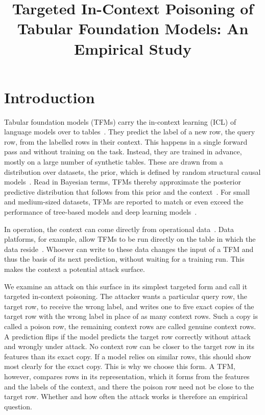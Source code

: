 \documentclass[pdflatex,sn-mathphys-num]{sn-jnl}
\title[Targeted in-context poisoning of tabular foundation models]{Targeted In-Context Poisoning of Tabular Foundation Models: An Empirical Study}
\author*[1]{\fnm{Adem} \sur{Alparslan}}\email{adem.alparslan@fom.de}
\affil*[1]{\orgname{FOM University of Applied Sciences for Economics and Management}, \orgaddress{\city{Essen}, \country{Germany}}}
\begin{document}
\maketitle

\section{Introduction}
\label{sec:einleitung}

Tabular foundation models (TFMs) carry the in-context learning (ICL) of
language models over to tables~\citep{brown2020, muller2022,
hollmann2025, qu2025, vanbreugel2024}. They predict the label of a new
row, the query row, from the labelled rows in their context. This happens
in a single forward pass and without training on the task. Instead, they
are trained in advance, mostly on a large number of synthetic tables.
These are drawn from a distribution over datasets, the prior, which is
defined by random structural causal models~\citep{hollmann2025, qu2026,
grinsztajn2026, jaeger2026}. Read in Bayesian terms, TFMs thereby
approximate the posterior predictive distribution that follows from this
prior and the context~\citep{muller2022, hollmann2025}. For small and
medium-sized datasets, TFMs are reported to match or even exceed the
performance of tree-based models and deep learning
models~\citep{qu2026, grinsztajn2026, kurashkin2026}.

In operation, the context can come directly from operational
data~\citep{sap2026}. Data platforms, for example, allow TFMs to be run
directly on the table in which the data
reside~\citep{kongdas2026, googlecloud2026}. Whoever can write to these
data changes the input of a TFM and thus the basis of its next
prediction, without waiting for a training run. This makes the context a
potential attack surface.

We examine an attack on this surface in its simplest targeted form and
call it targeted in-context poisoning. The attacker wants
a particular query row, the target row, to receive the wrong label, and
writes one to five exact copies of the target row with the wrong label
in place of as many context rows. Such a copy is called a poison row,
the remaining context rows are called genuine context rows. A prediction
flips if the model predicts the target row correctly without attack and
wrongly under attack. No context row can be closer to the target row in
its features than its exact copy. If a model relies on similar rows,
this should show most clearly for the exact copy. This is why we choose
this form. A TFM, however, compares rows in its representation, which it
forms from the features and the labels of the context, and there the
poison row need not be close to the target row. Whether and how often
the attack works is therefore an empirical question.
\end{document}
